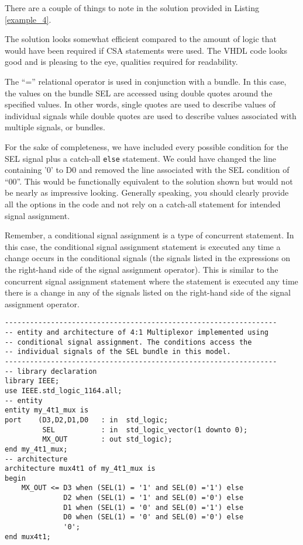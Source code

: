 There are a couple of things to note in the solution provided in Listing \ref{example_4}.
\begin{my_list}
\item The solution looks somewhat efficient compared to the amount of logic that would have been required if CSA statements were used. The VHDL code looks good and is pleasing to the eye, qualities required for readability.
\item The ``='' relational operator is used in conjunction with a bundle. In this case, the values on the bundle SEL are accessed using double quotes around the specified values. In other words, single quotes are used to describe values of individual signals while double quotes are used to describe values associated with multiple signals, or bundles.
\item For the sake of completeness, we have included every possible condition for the SEL signal plus a catch-all \texttt{else} statement. We could have changed the line containing '0' to D0 and removed the line associated with the SEL condition of ``00''. This would be functionally equivalent to the solution shown but would not be nearly as impressive looking. Generally speaking, you should clearly provide all the options in the code and not rely on a catch-all statement for intended signal assignment.
\end{my_list}
Remember, a conditional signal assignment is a type of concurrent statement. In this case, the conditional signal assignment statement is executed any time a change occurs in the conditional signals (the signals listed in the expressions on the right-hand side of the signal assignment operator). This is similar to the concurrent signal assignment statement where the statement is executed any time there is a change in any of the signals listed on the right-hand side of the signal assignment operator.

\begin{lstlisting}[float, label=example_4_bis, caption=Alternative solution to Example 4 accessing individual signals.]
-----------------------------------------------------------------
-- entity and architecture of 4:1 Multiplexor implemented using
-- conditional signal assignment. The conditions access the
-- individual signals of the SEL bundle in this model.
-----------------------------------------------------------------
-- library declaration
library IEEE;
use IEEE.std_logic_1164.all;
-- entity
entity my_4t1_mux is
port	(D3,D2,D1,D0   : in  std_logic;
         SEL           : in  std_logic_vector(1 downto 0);
         MX_OUT        : out std_logic);
end my_4t1_mux;
-- architecture
architecture mux4t1 of my_4t1_mux is
begin
	MX_OUT <= D3 when (SEL(1) = '1' and SEL(0) ='1') else
	          D2 when (SEL(1) = '1' and SEL(0) ='0') else
	          D1 when (SEL(1) = '0' and SEL(0) ='1') else
	          D0 when (SEL(1) = '0' and SEL(0) ='0') else
	          '0';
end mux4t1;
\end{lstlisting}


